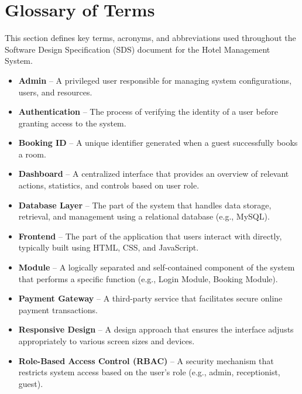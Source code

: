 \documentclass[a4paper,12pt]{article}
\begin{document}
\section{Glossary of Terms}

This section defines key terms, acronyms, and abbreviations used throughout the Software Design Specification (SDS) document for the Hotel Management System.

\begin{itemize}
    \item \textbf{Admin} – A privileged user responsible for managing system configurations, users, and resources.
    
    \item \textbf{Authentication} – The process of verifying the identity of a user before granting access to the system.
    
    \item \textbf{Booking ID} – A unique identifier generated when a guest successfully books a room.
    
    \item \textbf{Dashboard} – A centralized interface that provides an overview of relevant actions, statistics, and controls based on user role.
    
    \item \textbf{Database Layer} – The part of the system that handles data storage, retrieval, and management using a relational database (e.g., MySQL).
    
    \item \textbf{Frontend} – The part of the application that users interact with directly, typically built using HTML, CSS, and JavaScript.
    
    \item \textbf{Module} – A logically separated and self-contained component of the system that performs a specific function (e.g., Login Module, Booking Module).
    
    \item \textbf{Payment Gateway} – A third-party service that facilitates secure online payment transactions.
    
    \item \textbf{Responsive Design} – A design approach that ensures the interface adjusts appropriately to various screen sizes and devices.
    
    \item \textbf{Role-Based Access Control (RBAC)} – A security mechanism that restricts system access based on the user's role (e.g., admin, receptionist, guest).
    

\end{itemize}
\end{document}
